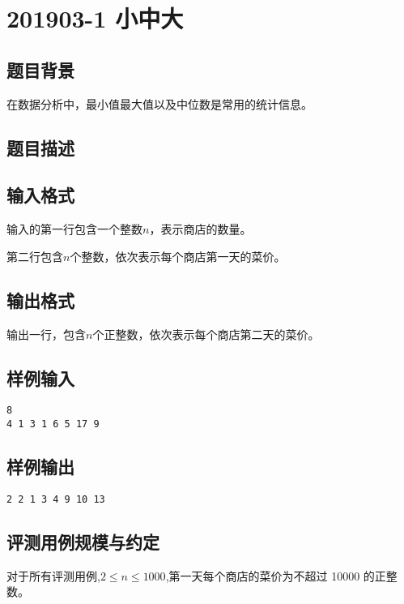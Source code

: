 \section{201903-1 小中大}

\subsection{题目背景}
在数据分析中，最小值最大值以及中位数是常用的统计信息。

\subsection{题目描述}%


\subsection{输入格式}

输入的第一行包含一个整数$n$，表示商店的数量。

第二行包含$n$个整数，依次表示每个商店第一天的菜价。

\subsection{输出格式}

输出一行，包含$n$个正整数，依次表示每个商店第二天的菜价。

\subsection{样例输入}

\begin{lstlisting}[numbers=none]
8
4 1 3 1 6 5 17 9
\end{lstlisting}

\subsection{样例输出}

\begin{lstlisting}[numbers=none]
2 2 1 3 4 9 10 13
\end{lstlisting}

\subsection{评测用例规模与约定}

对于所有评测用例,$2\leq n\leq1000$,第一天每个商店的菜价为不超过 10000 的正整数。

